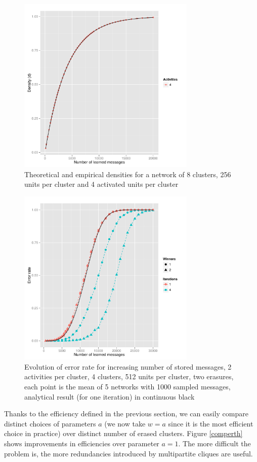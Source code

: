 \documentclass[english,10pt,twocolumn]{IEEEtran}
\theoremstyle{definition}
\begin{document}
		
	\begin{figure}[!htb]
		\includegraphics[width=8.5cm]{Courbes/remplacement_densite_c8l256a4}
		\caption{Theoretical and empirical densities for a network of 8 clusters, 256 units per cluster and 4 activated units per cluster}
			\label{densiteth}
	\end{figure}
	
	
	\begin{figure}[!htb]
		\includegraphics[width=8.5cm]{Courbes/remplacement_figure2g1} %
		\caption{Evolution of error rate for increasing number of stored messages, 2 activities per cluster, 4 clusters, 512 units per cluster, two erasures, each point is the mean of 5 networks with 1000 sampled messages, analytical result (for one iteration) in continuous black}
			\label{erasuresth}
		\end{figure}
		
		Thanks to the efficiency defined in the previous section, we can easily compare distinct choices of parameters $a$ (we now take $w = a$ since it is the most efficient choice in practice) over distinct number of erased clusters. Figure \ref{comperth} shows improvements in efficiencies over parameter $a =1$. The more difficult the problem is, the more redundancies introduced by multipartite cliques are useful.
		
\end{document}
